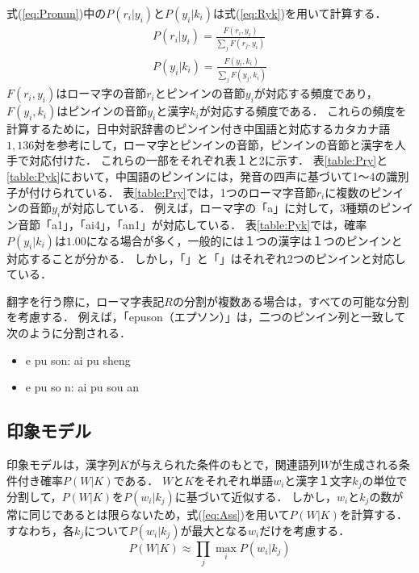 \documentclass[japanese]{jnlp_1.4}
\begin{document}
{式(\ref{eq:Pronun})中の$P(r_{i}|y_{i})$と$P(y_{i}|k_{i})$は式(\ref{eq:Ryk})を用いて計算する．
\begin{equation}
 \begin{split}
  P(r_{i}|y_{i})=\frac{F(r_{i},y_{i})}{\displaystyle{\sum_{j}}F(r_{j},y_{i})} \\
  P(y_{i}|k_{i})=\frac{F(y_{i},k_{i})}{\displaystyle{\sum_{j}}F(y_{j},k_{i})}\label{eq:Ryk}
 \end{split}
\end{equation}
$F(r_{i},y_{i})$はローマ字の音節$r_{i}$とピンインの音節$y_{i}$が対応する頻度であり，$F(y_{i},k_{i})$はピンインの音節$y_{i}$と漢字$k_{i}$が対応する頻度である．
これらの頻度を計算するために，日中対訳辞書\cite{Book_02}のピンイン付き中国語と対応するカタカナ語$1,136$対を参考にして，ローマ字とピンインの音節，ピンインの音節と漢字を人手で対応付けた．
これらの一部をそれぞれ表１と2に示す．
表\ref{table:Pry}と\ref{table:Pyk}において，中国語のピンインには，発音の四声に基づいて1〜4の識別子が付けられている．
表\ref{table:Pry}では，1つのローマ字音節$r_{i}$に複数のピンインの音節$y_{i}$が対応している．
例えば，ローマ字の「a」に対して，3種類のピンイン音節「a1」，「ai4」，「an1」が対応している．
表\ref{table:Pyk}では，確率$P(y_{i}|k_{i})$は$1.00$になる場合が多く，一般的には１つの漢字は１つのピンインと対応することが分かる．
しかし，「」と「」はそれぞれ2つのピンインと対応している．

翻字を行う際に，ローマ字表記$R$の分割が複数ある場合は，すべての可能な分割を考慮する．
例えば，「epuson（エプソン）」は，二つのピンイン列と一致して次のように分割される．
\begin{itemize}
\item e pu son: ai pu sheng
\item e pu so n: ai pu sou an
\end{itemize}



\subsection{印象モデル}\label{sec:meaning}

印象モデルは，漢字列$K$が与えられた条件のもとで，関連語列$W$が生成される条件付き確率$P(W|K)$である．
$W$と$K$をそれぞれ単語$w_{i}$と漢字１文字$k_{j}$の単位で分割して，$P(W|K)$を$P(w_{i}|k_{j})$に基づいて近似する．
しかし，$w_{i}$と$k_{j}$の数が常に同じであるとは限らないため，式(\ref{eq:Ass})を用いて$P(W|K)$を計算する．
すなわち，各$k_{j}$について$P(w_{i}|k_{j})$が最大となる$w_{i}$だけを考慮する．
\begin{equation}
 P(W|K)\approx {\displaystyle \prod_{j}}\max_{i}P(w_{i}|k_{j})\label{eq:Ass}
\end{equation} 

}
\end{document}
